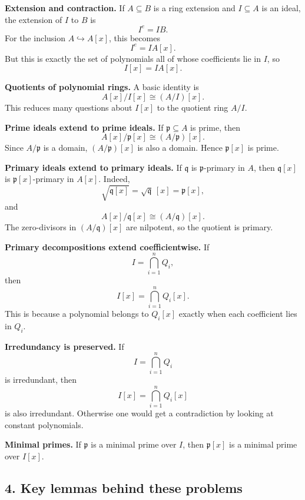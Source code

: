 \documentclass[12pt,a4paper]{article}
\theoremstyle{plain}
\theoremstyle{definition}      %
\begin{document}
	\textbf{Extension and contraction.}
	If \(A\subseteq B\) is a ring extension and \(I\subseteq A\) is an ideal, the extension of \(I\) to \(B\) is
	\[
	I^e=IB.
	\]
	For the inclusion \(A\hookrightarrow A[x]\), this becomes
	\[
	I^e=IA[x].
	\]
	But this is exactly the set of polynomials all of whose coefficients lie in \(I\), so
	\[
	I[x]=IA[x].
	\]
	
	\medskip
	
	\textbf{Quotients of polynomial rings.}
	A basic identity is
	\[
	A[x]/I[x]\cong (A/I)[x].
	\]
	This reduces many questions about \(I[x]\) to the quotient ring \(A/I\).
	
	\medskip
	
	\textbf{Prime ideals extend to prime ideals.}
	If \(\mathfrak p\subseteq A\) is prime, then
	\[
	A[x]/\mathfrak p[x]\cong (A/\mathfrak p)[x].
	\]
	Since \(A/\mathfrak p\) is a domain, \((A/\mathfrak p)[x]\) is also a domain. Hence \(\mathfrak p[x]\) is prime.
	
	\medskip
	
	\textbf{Primary ideals extend to primary ideals.}
	If \(\mathfrak q\) is \(\mathfrak p\)-primary in \(A\), then \(\mathfrak q[x]\) is \(\mathfrak p[x]\)-primary in \(A[x]\).
	Indeed,
	\[
	\sqrt{\mathfrak q[x]}=\sqrt{\mathfrak q}\,[x]=\mathfrak p[x],
	\]
	and
	\[
	A[x]/\mathfrak q[x]\cong (A/\mathfrak q)[x].
	\]
	The zero-divisors in \((A/\mathfrak q)[x]\) are nilpotent, so the quotient is primary.
	
	\medskip
	
	\textbf{Primary decompositions extend coefficientwise.}
	If
	\[
	I=\bigcap_{i=1}^n Q_i,
	\]
	then
	\[
	I[x]=\bigcap_{i=1}^n Q_i[x].
	\]
	This is because a polynomial belongs to \(Q_i[x]\) exactly when each coefficient lies in \(Q_i\).
	
	\medskip
	
	\textbf{Irredundancy is preserved.}
	If
	\[
	I=\bigcap_{i=1}^n Q_i
	\]
	is irredundant, then
	\[
	I[x]=\bigcap_{i=1}^n Q_i[x]
	\]
	is also irredundant. Otherwise one would get a contradiction by looking at constant polynomials.
	
	\medskip
	
	\textbf{Minimal primes.}
	If \(\mathfrak p\) is a minimal prime over \(I\), then \(\mathfrak p[x]\) is a minimal prime over \(I[x]\).
	
	\subsection*{4. Key lemmas behind these problems}
	
\end{document}
